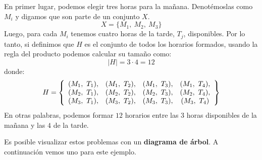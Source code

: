 \documentclass[12pt]{article}
\begin{document}
En primer lugar, podemos elegir tres horas para la mañana. Denotémoslas como $M_{i}$ y digamos que son parte de un conjunto $X$.
\[
  X = \{M_{1}, \ M_{2}, \ M_{3}\}
\]
Luego, para cada $M_{i}$ tenemos cuatro horas de la tarde, $T_{j}$, disponibles. Por lo tanto, si definimos que $H$ es el conjunto de todos los horarios formados, usando la regla del producto podemos calcular su tamaño como:
\[
  |H| = 3 \cdot 4 = 12
\]
donde:
\[
H =
\left\{
\begin{array}{c c c c}
(M_{1}, \ T_{1}), & (M_{1}, \ T_{2}), & (M_{1}, \ T_{3}), & (M_{1}, \ T_{4}), \\
(M_{2}, \ T_{1}), & (M_{2}, \ T_{2}), & (M_{2}, \ T_{3}), & (M_{2}, \ T_{4}), \\
(M_{3}, \ T_{1}), & (M_{3}, \ T_{2}), & (M_{3}, \ T_{3}), & (M_{3}, \ T_{4})
\end{array}
\right\}
\]
En otras palabras, podemos formar $12$ horarios entre las $3$ horas disponibles de la mañana y las $4$ de la tarde.

Es posible visualizar estos problemas con un \textbf{diagrama de árbol}. A continuación vemos uno para este ejemplo.

\newpage
\end{document}
